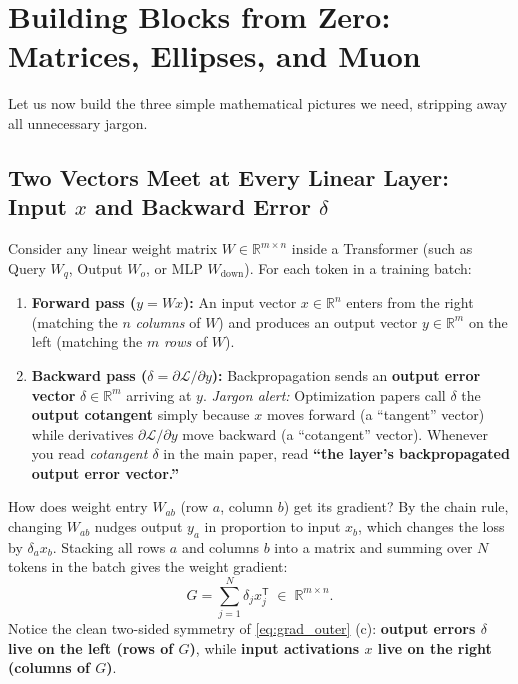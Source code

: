 \documentclass[11pt]{article}
\newcommand{\Tr}{{\mathsf{T}}}
\newcommand{\R}{\mathbb{R}}
\begin{document}
\section{Building Blocks from Zero: Matrices, Ellipses, and Muon}
\label{sec:primer}

Let us now build the three simple mathematical pictures we need, stripping away all unnecessary jargon.

\subsection{Two Vectors Meet at Every Linear Layer: Input \texorpdfstring{$x$}{x} and Backward Error \texorpdfstring{$\delta$}{delta}}
\label{sec:x_and_delta}

Consider any linear weight matrix $W \in \R^{m \times n}$ inside a Transformer (such as Query $W_q$, Output $W_o$, or MLP $W_{\mathrm{down}}$). For each token in a training batch:
\begin{enumerate}[leftmargin=1.6em, itemsep=2pt, topsep=2pt]
  \item \textbf{Forward pass ($y = W x$):} An input vector $x \in \R^n$ enters from the right (matching the $n$ \emph{columns} of $W$) and produces an output vector $y \in \R^m$ on the left (matching the $m$ \emph{rows} of $W$).
  \item \textbf{Backward pass ($\delta = \partial\mathcal{L}/\partial y$):} Backpropagation sends an \textbf{output error vector} $\delta \in \R^m$ arriving at $y$.
  \emph{Jargon alert:} Optimization papers call $\delta$ the \textbf{output cotangent} simply because $x$ moves forward (a ``tangent'' vector) while derivatives $\partial\mathcal{L}/\partial y$ move backward (a ``cotangent'' vector). Whenever you read \emph{cotangent $\delta$} in the main paper, read \textbf{``the layer's backpropagated output error vector.''}
\end{enumerate}

How does weight entry $W_{ab}$ (row $a$, column $b$) get its gradient? By the chain rule, changing $W_{ab}$ nudges output $y_a$ in proportion to input $x_b$, which changes the loss by $\delta_a x_b$. Stacking all rows $a$ and columns $b$ into a matrix and summing over $N$ tokens in the batch gives the weight gradient:
\begin{equation}
  G = \sum_{j=1}^{N} \delta_j x_j^{\Tr} \;\in\; \R^{m \times n}.
  \label{eq:grad_outer}
\end{equation}
Notice the clean two-sided symmetry of \eqref{eq:grad_outer} (c): \textbf{output errors $\delta$ live on the left (rows of $G$)}, while \textbf{input activations $x$ live on the right (columns of $G$)}.
\end{document}
